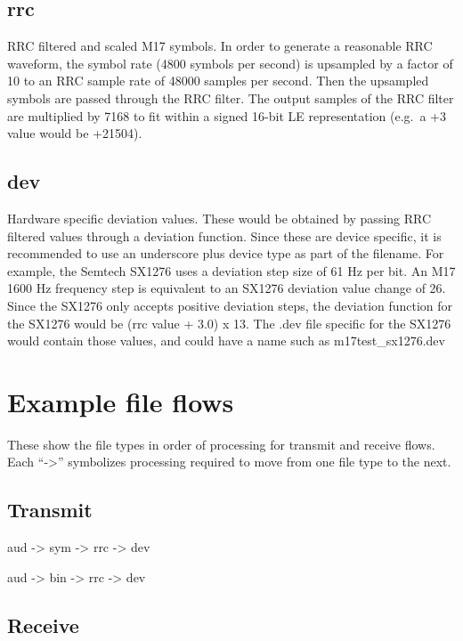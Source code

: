 \documentclass[a4paper,11pt]{book}
\begin{document}
\subsection{rrc}

RRC filtered and scaled M17 symbols. In order to generate a reasonable RRC waveform, the symbol rate (4800 symbols per second) is upsampled by a factor of 10 to an RRC sample rate of 48000 samples per second. Then the upsampled symbols are passed through the RRC filter. The output samples of the RRC filter are multiplied by 7168 to fit within a signed 16-bit LE representation (e.g.~a +3 value would be +21504).

\subsection{dev}

Hardware specific deviation values. These would be obtained by passing RRC filtered values through a deviation function. Since these are device specific, it is recommended to use an underscore plus device type as part of the filename. For example, the Semtech SX1276 uses a deviation step size of 61 Hz per bit. An M17 1600 Hz frequency step is equivalent to an SX1276 deviation value change of 26. Since the SX1276 only accepts positive deviation steps, the deviation function for the SX1276 would be (rrc value + 3.0) x 13. The .dev file specific for the SX1276 would contain those values, and could have a name such as m17test\_sx1276.dev

\section{Example file flows}

These show the file types in order of processing for transmit and receive flows. Each ``-\textgreater{}'' symbolizes processing required to move from one file type to the next.

\subsection{Transmit}

aud -\textgreater{} sym -\textgreater{} rrc -\textgreater{} dev

aud -\textgreater{} bin -\textgreater{} rrc -\textgreater{} dev

\subsection{Receive}
\end{document}
